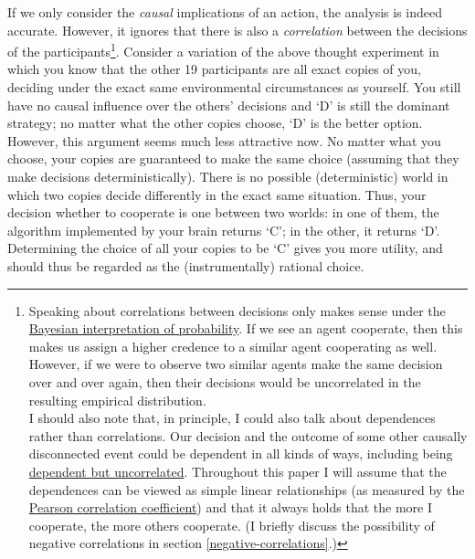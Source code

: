 If we only consider the \emph{causal} implications of an action, the
analysis is indeed accurate. However, it ignores that there is also a
\emph{correlation} between the decisions of the participants\footnote{Speaking
  about correlations between decisions only makes sense under the
  \href{https://en.wikipedia.org/wiki/Bayesian_probability}{Bayesian
  interpretation of probability}. If we see an agent cooperate, then
  this makes us assign a higher credence to a similar agent cooperating
  as well. However, if we were to observe two similar agents make the
  same decision over and over again, then their decisions would be
  uncorrelated in the resulting empirical
  distribution.\\[1\baselineskip]I should also note that, in principle,
  I could also talk about dependences rather than correlations. Our
  decision and the outcome of some other causally disconnected event
  could be dependent in all kinds of ways, including being
  \href{https://stats.stackexchange.com/questions/179511/why-zero-correlation-does-not-necessarily-imply-independence}{dependent
  but uncorrelated}. Throughout this paper I will assume that the
  dependences can be viewed as simple linear relationships (as measured
  by the
  \href{https://en.wikipedia.org/wiki/Pearson_correlation_coefficient}{Pearson
  correlation coefficient}) and that it always holds that the more I
  cooperate, the more others cooperate. (I briefly discuss the
  possibility of negative correlations in section
  \ref{negative-correlations}.)}. Consider a variation of the above thought
experiment in which you know that the other 19 participants are all
exact copies of you, deciding under the exact same environmental
circumstances as yourself. You still have no causal influence over the
others' decisions and `D' is still the dominant strategy; no matter what
the other copies choose, `D' is the better option. However, this
argument seems much less attractive now. No matter what you choose, your
copies are guaranteed to make the same choice (assuming that they make
decisions deterministically). There is no possible (deterministic) world
in which two copies decide differently in the exact same situation.
Thus, your decision whether to cooperate is one between two worlds: in
one of them, the algorithm implemented by your brain returns `C'; in the
other, it returns `D'. Determining the choice of all your copies to be
`C' gives you more utility, and should thus be regarded as the
(instrumentally) rational choice.

